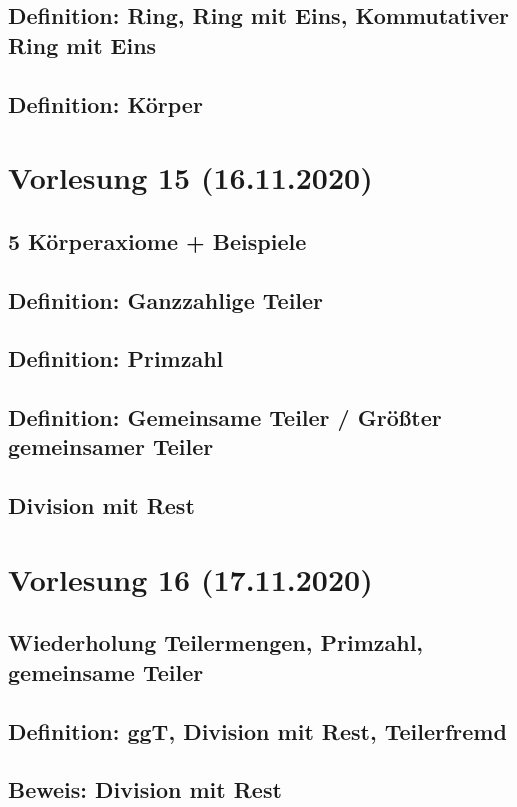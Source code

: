 \documentclass[]{article}
\begin{document}
\subsection{Definition: Ring, Ring mit Eins, Kommutativer Ring mit Eins}
\subsection{Definition: Körper}


\section{Vorlesung 15 (16.11.2020)}
\subsection{5 Körperaxiome + Beispiele}
\subsection{Definition: Ganzzahlige Teiler}
\subsection{Definition: Primzahl}
\subsection{Definition: Gemeinsame Teiler / Größter gemeinsamer Teiler}
\subsection{Division mit Rest}


\section{Vorlesung 16 (17.11.2020)}
\subsection{Wiederholung Teilermengen, Primzahl, gemeinsame Teiler}
\subsection{Definition: ggT, Division mit Rest, Teilerfremd}
\subsection{Beweis: Division mit Rest}
\end{document}
